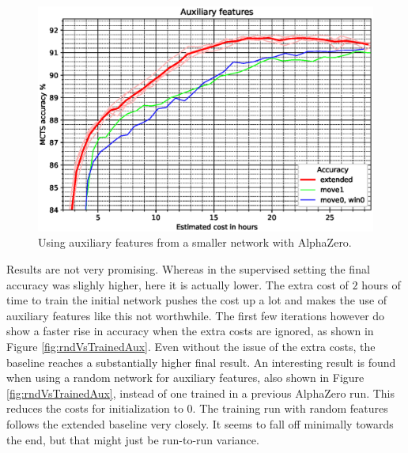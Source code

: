 \documentclass[12pt,onecolumn,oneside,titlepage]{article}
\begin{document}
\begin{figure}[H]
\centering
\includegraphics[clip,width=\columnwidth]{auxiliary_attempt1}
\caption{Using auxiliary features from a smaller network with AlphaZero.}
\label{fig:auxiliary_attempt1}
\end{figure}

Results are not very promising. Whereas in the supervised setting the final accuracy was slighly higher, here it is actually lower. The extra cost of $2$ hours of time to train the initial network pushes the cost up a lot and makes the use of auxiliary features like this not worthwhile.
The first few iterations however do show a faster rise in accuracy when the extra costs are ignored, as shown in Figure \ref{fig:rndVsTrainedAux}. Even without the issue of the extra costs, the baseline reaches a substantially higher final result.
An interesting result is found when using a random network for auxiliary features, also shown in Figure \ref{fig:rndVsTrainedAux}, instead of one trained in a previous AlphaZero run. This reduces the costs for initialization to $0$. The training run with random features follows the extended baseline very closely.
It seems to fall off minimally towards the end, but that might just be run-to-run variance. 
\end{document}
